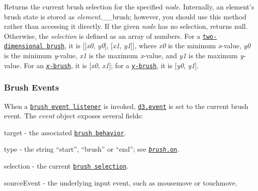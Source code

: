 Returns the current brush selection for the specified {\itshape node}. Internally, an element’s brush state is stored as {\itshape element}.\+\_\+\+\_\+brush; however, you should use this method rather than accessing it directly. If the given {\itshape node} has no selection, returns null. Otherwise, the {\itshape selection} is defined as an array of numbers. For a \href{#brush}{\tt two-\/dimensional brush}, it is \mbox{[}\mbox{[}{\itshape x0}, {\itshape y0}\mbox{]}, \mbox{[}{\itshape x1}, {\itshape y1}\mbox{]}\mbox{]}, where {\itshape x0} is the minimum {\itshape x}-\/value, {\itshape y0} is the minimum {\itshape y}-\/value, {\itshape x1} is the maximum {\itshape x}-\/value, and {\itshape y1} is the maximum {\itshape y}-\/value. For an \href{#brushX}{\tt {\itshape x}-\/brush}, it is \mbox{[}{\itshape x0}, {\itshape x1}\mbox{]}; for a \href{#brushY}{\tt {\itshape y}-\/brush}, it is \mbox{[}{\itshape y0}, {\itshape y1}\mbox{]}.

\subsubsection*{Brush Events}

When a \href{#brush_on}{\tt brush event listener} is invoked, \href{https://github.com/d3/d3-selection#event}{\tt d3.\+event} is set to the current brush event. The {\itshape event} object exposes several fields\+:


\begin{DoxyItemize}
\item {\ttfamily target} -\/ the associated \href{#brush}{\tt brush behavior}.
\item {\ttfamily type} -\/ the string “start”, “brush” or “end”; see \href{#brush_on}{\tt {\itshape brush}.on}.
\item {\ttfamily selection} -\/ the current \href{#brushSelection}{\tt brush selection}.
\item {\ttfamily source\+Event} -\/ the underlying input event, such as mousemove or touchmove. 
\end{DoxyItemize}